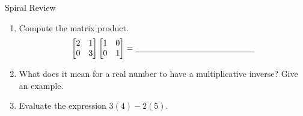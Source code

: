 \documentclass[10pt]{article}
\begin{document}
\namedateperiod

\vspace{0.12in}

\begin{notesbox}{Spiral Review}
\begin{enumerate}[leftmargin=1.5em, itemsep=10pt]

  \item Compute the matrix product.
        \[
          \begin{bmatrix}2 & 1 \\ 0 & 3\end{bmatrix}
          \begin{bmatrix}1 & 0 \\ 0 & 1\end{bmatrix}
          = \blank{5cm}
        \]
        \vspace{0.1in}

  \item What does it mean for a real number to have a multiplicative inverse?
        Give an example.

        \writeline
        \writeline

  \item Evaluate the expression $3(4) - 2(5)$.

        \vspace{0.05in}
        \blank{5cm}

\end{enumerate}
\end{notesbox}
\end{document}
